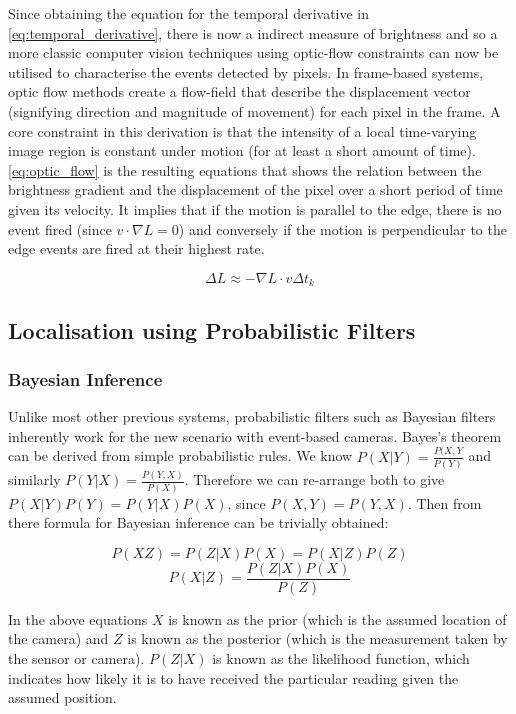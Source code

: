 Since obtaining the equation for the temporal derivative in \autoref{eq:temporal_derivative}, there is now a indirect measure of brightness and so a more classic computer vision techniques using optic-flow constraints can now be utilised to characterise the events detected by pixels. In frame-based systems, optic flow methods create a flow-field that describe the displacement vector (signifying direction and magnitude of movement) for each pixel in the frame. A core constraint in this derivation is that the intensity of a local time-varying image region is constant under motion (for at least a short amount of time)\cite{GenerativeEventModel}. \autoref{eq:optic_flow} is the resulting equations that shows the relation between the brightness gradient and the displacement of the pixel over a short period of time given its velocity\cite{EventBasedVisionASurvery}. It implies that if the motion is parallel to the edge, there is no event fired (since $ v \cdot \nabla L = 0  $) and conversely if the motion is perpendicular to the edge events are fired at their highest rate.

\begin{equation}
      \Delta L \approx -\nabla L \cdot v \Delta t_k
      \label{eq:optic_flow}
\end{equation}

\subsection{Localisation using Probabilistic Filters}

\subsubsection{Bayesian Inference}

Unlike most other previous systems, probabilistic filters such as Bayesian filters inherently work for the new scenario with event-based cameras. Bayes's theorem can be derived from simple probabilistic rules\cite{BayesLaw}. We know $P(X|Y) = \frac{P(X, Y}{P(Y)} $ and similarly $ P(Y|X) = \frac{P(Y, X)}{P(X)} $. Therefore we can re-arrange both to give $ P(X|Y)P(Y) = P(Y|X)P(X) $, since $ P(X, Y) = P(Y, X) $. Then from there formula for Bayesian inference can be trivially obtained:

$$ P(XZ) = P(Z|X)P(X) = P(X|Z)P(Z) $$
$$ P(X|Z) = \frac{P(Z|X)P(X)}{P(Z)}$$

In the above equations $ X $ is known as the prior (which is the assumed location of the camera) and $ Z $ is known as the posterior (which is the measurement taken by the sensor or camera). $P(Z|X) $ is known as the likelihood function, which indicates how likely it is to have received the particular reading given the assumed position.

